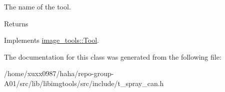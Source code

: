The name of the tool. 

\begin{DoxyReturn}{Returns}

\end{DoxyReturn}


Implements \hyperlink{classimage__tools_1_1Tool_a251c179e3ac9756d08fbcd082750f8a9}{image\+\_\+tools\+::\+Tool}.



The documentation for this class was generated from the following file\+:\begin{DoxyCompactItemize}
\item 
/home/xuxx0987/haha/repo-\/group-\/\+A01/src/lib/libimgtools/src/include/t\+\_\+spray\+\_\+can.\+h\end{DoxyCompactItemize}
